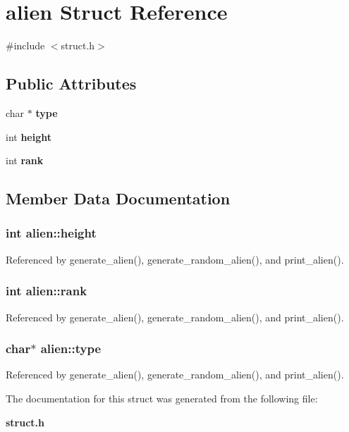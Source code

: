 \section{alien Struct Reference}
\label{structalien}


{\ttfamily \#include $<$struct.\-h$>$}

\subsection*{Public Attributes}
\begin{DoxyCompactItemize}
\item 
char $\ast$ {\bf type}
\item 
int {\bf height}
\item 
int {\bf rank}
\end{DoxyCompactItemize}


\subsection{Member Data Documentation}
\subsubsection[{height}]{\setlength{\rightskip}{0pt plus 5cm}int alien\-::height}\label{structalien_a211dfe352cc8d09dab06433c1ac79869}


Referenced by generate\-\_\-alien(), generate\-\_\-random\-\_\-alien(), and print\-\_\-alien().

\subsubsection[{rank}]{\setlength{\rightskip}{0pt plus 5cm}int alien\-::rank}\label{structalien_a931030b20515d6d0c96e35adc53398b1}


Referenced by generate\-\_\-alien(), generate\-\_\-random\-\_\-alien(), and print\-\_\-alien().

\subsubsection[{type}]{\setlength{\rightskip}{0pt plus 5cm}char$\ast$ alien\-::type}\label{structalien_a49a02ba03d5db0fe6e3e196d2c7c6865}


Referenced by generate\-\_\-alien(), generate\-\_\-random\-\_\-alien(), and print\-\_\-alien().



The documentation for this struct was generated from the following file\-:\begin{DoxyCompactItemize}
\item 
{\bf struct.\-h}\end{DoxyCompactItemize}
